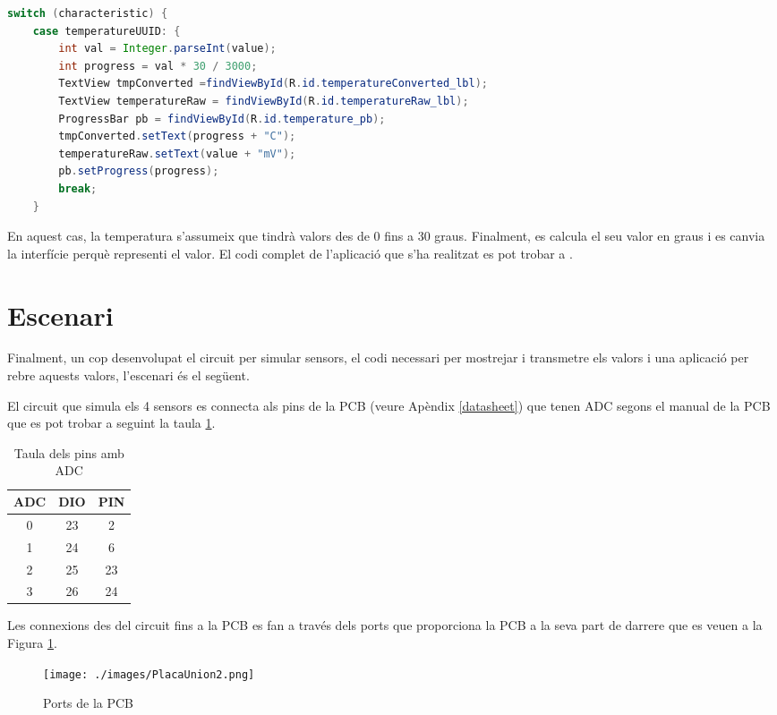 \begin{lstlisting}[language=java]
 switch (characteristic) {
	case temperatureUUID: {
		int val = Integer.parseInt(value);
		int progress = val * 30 / 3000;
		TextView tmpConverted =findViewById(R.id.temperatureConverted_lbl);
		TextView temperatureRaw = findViewById(R.id.temperatureRaw_lbl);
		ProgressBar pb = findViewById(R.id.temperature_pb);
		tmpConverted.setText(progress + "C");
		temperatureRaw.setText(value + "mV");
		pb.setProgress(progress);
		break;
	}
\end{lstlisting}

En aquest cas, la temperatura s'assumeix que tindrà valors des de 0 fins a 30 graus.
Finalment, es calcula el seu valor en graus i es canvia la interfície perquè representi el valor.
El codi complet de l'aplicació que s'ha realitzat es pot trobar a \cite{android_repo}.

\section{Escenari}
Finalment, un cop desenvolupat el circuit per simular sensors, el codi necessari per mostrejar i transmetre els valors i una aplicació per rebre aquests valors, l'escenari és el següent.

El circuit que simula els 4 sensors es connecta als pins de la PCB (veure Apèndix \ref{datasheet}) que tenen ADC segons el manual de la PCB que es pot trobar a \cite{manual_placa} seguint la taula \ref{connexions}.

\begin{table}[!h]
	\begin{center}
		\begin{tabular}{|c|c|c|}
			\hline
			ADC			&	DIO		& 	PIN		\\	\hline
			0			&	23		&	2		\\	\hline
			1			&	24		&	6		\\	\hline
			2			&	25		&	23		\\	\hline
			3			&	26		&	24		\\	\hline
		\end{tabular}
	\end{center}
	\caption{Taula dels pins amb ADC}
	\label{connexions}
\end{table}

Les connexions des del circuit fins a la PCB es fan a través dels ports que proporciona la PCB a la seva part de darrere que es veuen a la Figura \ref{ports_placa}.

\begin{figure}[h]
	\begin{center}
		\texttt{[image: ./images/PlacaUnion2.png]}
		\caption{Ports de la PCB}
		\label{ports_placa}
	\end{center}
\end{figure}

